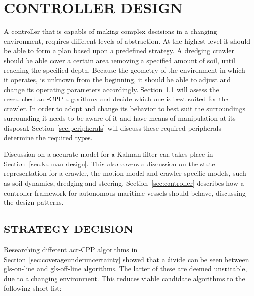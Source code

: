 \chapter{CONTROLLER DESIGN}\label{chap:controller design}

A controller that is capable of making complex decisions in a changing environment, requires different levels of
abstraction. At the highest level it should be able to form a plan based upon a predefined strategy. A dredging crawler
should be able cover a certain area removing a specified amount of soil, until reaching the specified depth. Because the
geometry of the environment in which it operates, is unknown from the beginning, it should be able to adjust and change
its operating parameters accordingly. Section~\ref{sec:strategy decision} will assess the researched \gls{acr-CPP}
algorithms and decide which one is best suited for the crawler. In order to adopt and change its behavior to best suit
the surroundings surrounding it needs to be aware of it and have means of manipulation at its disposal.
Section~\ref{sec:peripherals} will discuss these required peripherals determine the required types.

Discussion on a accurate model for a Kalman filter can takes place in Section~\ref{sec:kalman design}. This also covers
a discussion on the state representation for a crawler, the motion model and crawler specific models, such as soil
dynamics, dredging and steering. Section~\ref{sec:controller} describes how a controller framework for autonomous
maritime vessels should behave, discussing the design patterns.

\section{STRATEGY DECISION}\label{sec:strategy decision}

Researching different \gls{acr-CPP} algorithms in Section~\ref{sec:coverageunderuncertainty} showed that a divide can be
seen between \gls{gls-on-line} and \gls{gls-off-line} algorithms. The latter of these are deemed unsuitable, due to a
changing environment. This reduces viable candidate algorithms to the following short-list:


